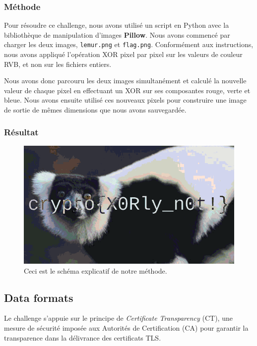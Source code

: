 \subsubsection{Méthode}
Pour résoudre ce challenge, nous avons utilisé un script en Python avec la
bibliothèque de manipulation d'images \textbf{Pillow}. Nous avons commencé
par charger les deux images, \texttt{lemur.png} et \texttt{flag.png}.
Conformément aux instructions, nous avons appliqué l'opération XOR pixel
par pixel sur les valeurs de couleur RVB, et non sur les fichiers
entiers.

Nous avons donc parcouru les deux images simultanément et calculé la
nouvelle valeur de chaque pixel en effectuant un XOR sur ses composantes
rouge, verte et bleue. Nous avons ensuite utilisé ces nouveaux pixels
pour construire une image de sortie de mêmes dimensions que nous avons
sauvegardée.

\subsubsection{Résultat}
\begin{figure}[H]
    \centering
    \includegraphics[width=0.8\linewidth]{Images/Lemur/xored_result.png}

    \caption{Ceci est le schéma explicatif de notre méthode.}

    \label{fig:encodeChallRes}
\end{figure}

\subsection{Data formats}

Le challenge s'appuie sur le principe de \emph{Certificate Transparency}
(CT), une mesure de sécurité imposée aux Autorités de Certification (CA)
pour garantir la transparence dans la délivrance des certificats TLS.

